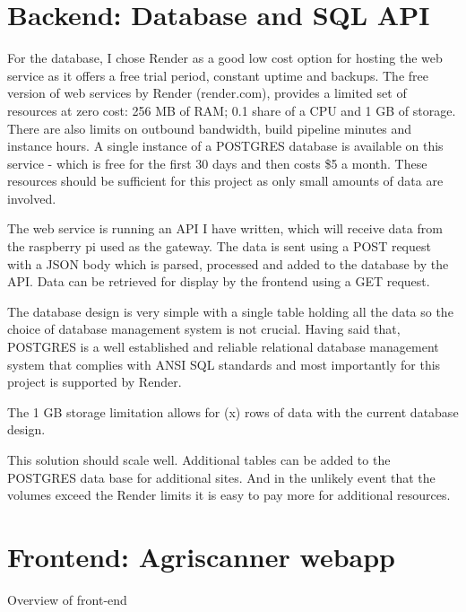 \section{Backend: Database and SQL API}

For the database, I chose Render as a good low cost option for hosting the web
service as it offers a free trial period, constant uptime and backups. The free
version of web services by Render (render.com), provides a limited set of
resources at zero cost: 256 MB of RAM; 0.1 share of a CPU and 1 GB of storage.
There are also limits on outbound bandwidth, build pipeline minutes and instance
hours. A single instance of a POSTGRES database is available on this service -
which is free for the first 30 days and then costs \$5 a month. These resources
should be sufficient for this project as only small amounts of data are
involved.

The web service is running an API I have written, which will receive data from
the raspberry pi used as the gateway. The data is sent using a POST request
with a JSON body which is parsed, processed and added to the database by the
API. Data can be retrieved for display by the frontend using a GET request.

The database design is very simple with a single table holding all the data so
the choice of database management system is not crucial. Having said that,
POSTGRES is a well established and reliable relational database management
system that complies with ANSI SQL standards and most importantly for this
project is supported by Render.

The 1 GB storage limitation allows for (x) rows of data with the current
database design.

This solution should scale well. Additional tables can be added to the POSTGRES
data base for additional sites. And in the unlikely event that the volumes
exceed the Render limits it is easy to pay more for additional resources.

\section{Frontend: Agriscanner webapp}

Overview of front-end